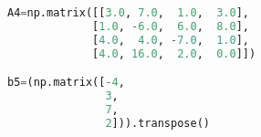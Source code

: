 \begin{lstlisting}[language=Python, style=jupycolors]
A4=np.matrix([[3.0, 7.0,  1.0,  3.0],
             [1.0, -6.0,  6.0,  8.0],
             [4.0,  4.0, -7.0,  1.0],
             [4.0, 16.0,  2.0,  0.0]])

b5=(np.matrix([-4,
               3,
               7,
               2])).transpose()

\end{lstlisting}